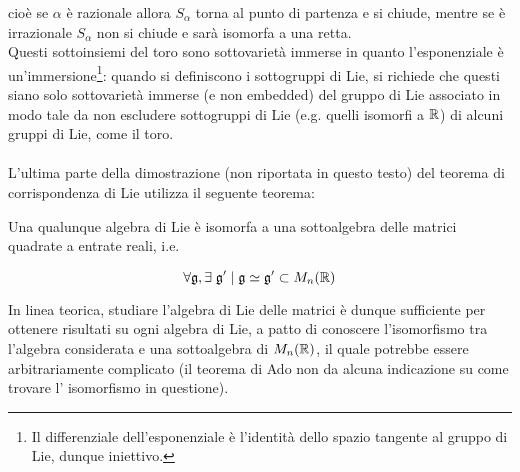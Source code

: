 cioè se $ \alpha $ è razionale allora $ S_{\alpha} $ torna al punto di partenza e si chiude, mentre se è irrazionale $ S_{\alpha} $ non si chiude e sarà isomorfa a una retta.\\
Questi sottoinsiemi del toro sono sottovarietà immerse in quanto l'esponenziale è un'immersione\footnote{%
	Il differenziale dell'esponenziale è l'identità dello spazio tangente al gruppo di Lie, dunque iniettivo.%
}: quando si definiscono i sottogruppi di Lie, si richiede che questi siano solo sottovarietà immerse (e non embedded) del gruppo di Lie associato in modo tale da non escludere sottogruppi di Lie (e.g. quelli isomorfi a $ \mathbb{R} $) di alcuni gruppi di Lie, come il toro.\\\\
%
L'ultima parte della dimostrazione (non riportata in questo testo) del teorema di corrispondenza di Lie utilizza il seguente teorema:

\begin{theorem}
	Una qualunque algebra di Lie è isomorfa a una sottoalgebra delle matrici quadrate a entrate reali, i.e.
	
	\begin{equation}
		\forall \mathfrak{g}, \exists \;  \mathfrak{g}' \mid \mathfrak{g} \simeq \mathfrak{g}' \subset M_{n}(\mathbb{R})
	\end{equation}
\end{theorem}

In linea teorica, studiare l'algebra di Lie delle matrici è dunque sufficiente per ottenere risultati su ogni algebra di Lie, a patto di conoscere l'isomorfismo tra l'algebra considerata e una sottoalgebra di $ M_{n}(\mathbb{R}) $, il quale potrebbe essere arbitrariamente complicato (il teorema di Ado non da alcuna indicazione su come trovare l' isomorfismo in questione).
